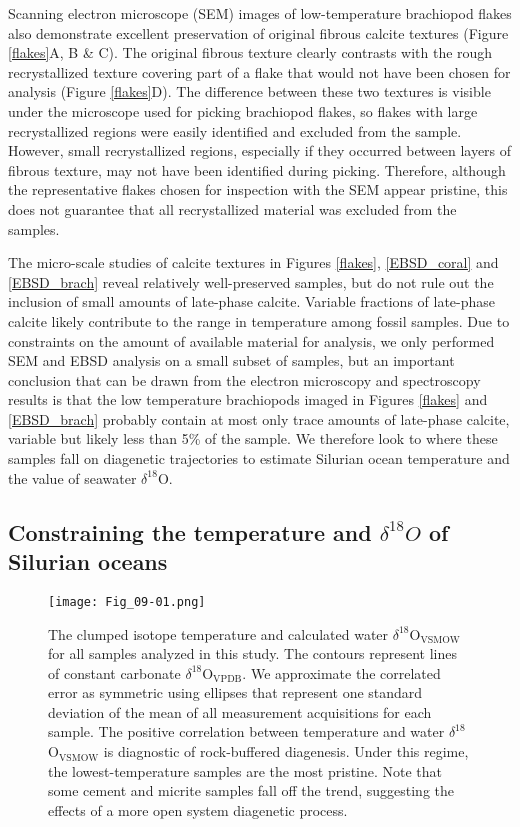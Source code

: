 \documentclass[5p, authoryear]{elsarticle}
\begin{document}
Scanning electron microscope (SEM) images of low-temperature brachiopod flakes also demonstrate excellent preservation of original fibrous calcite textures (Figure \ref{flakes}A, B \& C). The original fibrous texture clearly contrasts with the rough recrystallized texture covering part of a flake that would not have been chosen for analysis (Figure \ref{flakes}D). The difference between these two textures is visible under the microscope used for picking brachiopod flakes, so flakes with large recrystallized regions were easily identified and excluded from the sample. However, small recrystallized regions, especially if they occurred between layers of fibrous texture, may not have been identified during picking. Therefore, although the representative flakes chosen for inspection with the SEM appear pristine, this does not guarantee that all recrystallized material was excluded from the samples.

The micro-scale studies of calcite textures in Figures  \ref{flakes}, \ref{EBSD_coral} and \ref{EBSD_brach} reveal relatively well-preserved samples, but do not rule out the inclusion of small amounts of late-phase calcite. Variable fractions of late-phase calcite likely contribute to the range in temperature among fossil samples. Due to constraints on the amount of available material for analysis, we only performed SEM and EBSD analysis on a small subset of samples, but an important conclusion that can be drawn from the electron microscopy and spectroscopy results is that the low temperature brachiopods imaged in Figures \ref{flakes} and \ref{EBSD_brach} probably contain at most only trace amounts of late-phase calcite, variable but likely less than 5\% of the sample. We therefore look to where these samples fall on diagenetic trajectories to estimate Silurian ocean temperature and the value of seawater $\delta^{18}$O.

\subsection{Constraining the temperature and $\mathit{\delta^{18}}\textit{O}$ of Silurian oceans} 

\begin{figure}[b]
\centering
\texttt{[image: Fig\_09-01.png]}
\caption{The clumped isotope temperature and calculated water $\delta^{18}$O$_{\text{VSMOW}}$ for all samples analyzed in this study. The contours represent lines of constant carbonate $\delta^{18}$O$_{\text{VPDB}}$. We approximate the correlated error as symmetric using ellipses that represent one standard deviation of the mean of all measurement acquisitions for each sample. The positive correlation between temperature and water $\delta^{18}$O$_{\text{VSMOW}}$ is diagnostic of rock-buffered diagenesis. Under this regime, the lowest-temperature samples are the most pristine. Note that some cement and micrite samples fall off the trend, suggesting the effects of a more open system diagenetic process.}
\label{ellipses}
\end{figure}
\end{document}
